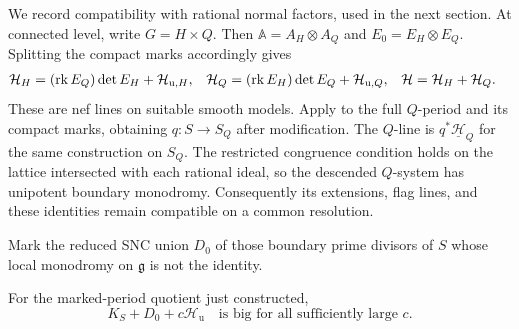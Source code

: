 We record compatibility with rational normal factors, used in
the next section.  At connected level, write $G=H\times Q$.
Then $\mathbb A=A_H\otimes A_Q$ and
$E_0=E_H\otimes E_Q$.  Splitting the compact marks accordingly
gives
\begin{align}\label{eq:marked-factor-lines}
 \mathcal H_H
   &=(\operatorname{rk} E_Q)\det E_H+\mathcal H_{\mathrm u,H},&
 \mathcal H_Q
   &=(\operatorname{rk} E_H)\det E_Q+\mathcal H_{\mathrm u,Q},&
 \mathcal H&=\mathcal H_H+\mathcal H_Q.
\end{align}
These are nef lines on suitable smooth models.  Apply
 to the full $Q$-period and its
compact marks, obtaining $q:S\to S_Q$ after modification.
The $Q$-line is $q^*\underline{\mathcal H}_Q$ for the same
construction on $S_Q$.  The restricted congruence condition
holds on the lattice intersected with each rational ideal, so
the descended $Q$-system has unipotent boundary monodromy.
Consequently its extensions, flag lines, and these identities
remain compatible on a common resolution.

Mark the reduced SNC union $D_0$ of those boundary prime
divisors of $S$ whose local monodromy on $\mathfrak g$ is
not the identity.

\begin{lemma}\label{lem:initial-adjoint}
For the marked-period quotient just constructed,
\[
 K_S+D_0+c\mathcal H_{\mathrm u}
 \quad\text{is big for all sufficiently large }c.
\]
\end{lemma}

